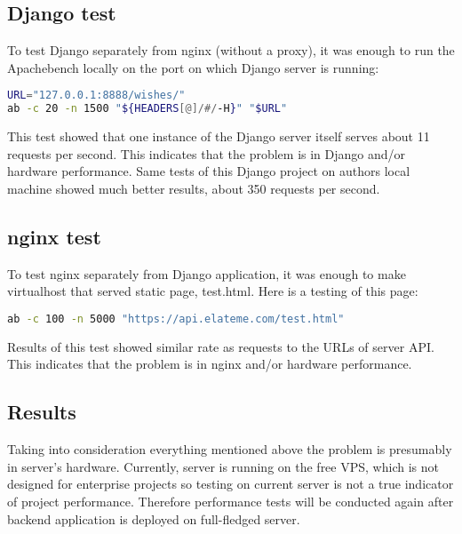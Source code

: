 \subsection{Django test}
To test Django separately from nginx (without a proxy), it was enough to run the Apachebench locally on the port on
which Django server is running:

\begin{lstlisting}[language=bash]
URL="127.0.0.1:8888/wishes/"
ab -c 20 -n 1500 "${HEADERS[@]/#/-H}" "$URL"
\end{lstlisting}

This test showed that one instance of the Django server itself serves about 11 requests per second. This indicates that
the problem is in Django and/or hardware performance. Same tests of this Django project on authors local machine showed
much better results, about 350 requests per second.


\subsection{nginx test}
To test nginx separately from Django application, it was enough to make virtualhost that served static page, test.html.
Here is a testing of this page:

\begin{lstlisting}[language=bash]
ab -c 100 -n 5000 "https://api.elateme.com/test.html"
\end{lstlisting}

Results of this test showed similar rate as requests to the \ac{URL}s of server \ac{API}. This indicates that the
problem is in nginx and/or hardware performance.


\subsection{Results}
Taking into consideration everything mentioned above the problem is presumably in server's hardware. Currently, server
is running on the free \ac{VPS}, which is not designed for enterprise projects so testing on current server is not a
true indicator of project performance. Therefore performance tests will be conducted again after backend application is
deployed on full-fledged server.


